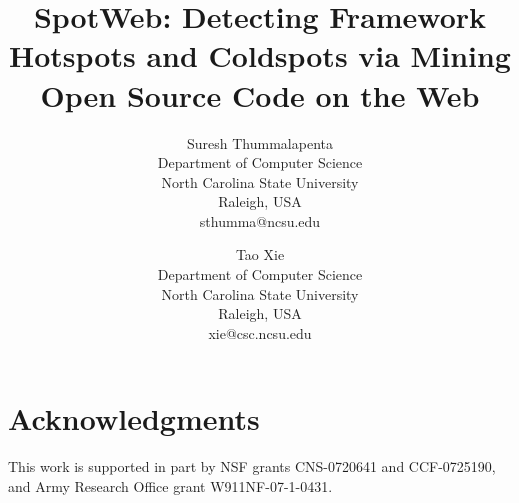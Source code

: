 \documentclass[conference]{IEEEtran}
\begin{document}
\title{SpotWeb: Detecting Framework Hotspots and Coldspots via Mining Open Source Code on the Web}

\author{Suresh Thummalapenta\\
Department of Computer Science\\ North Carolina State University \\
Raleigh, USA\\ sthumma@ncsu.edu\\
\and
Tao Xie\\
Department of Computer Science\\ North Carolina State University \\
Raleigh, USA\\ xie@csc.ncsu.edu\\
}

\maketitle
\thispagestyle{empty}










\section*{Acknowledgments}

This work is supported in part by NSF grants CNS-0720641 and
CCF-0725190, and Army Research Office grant W911NF-07-1-0431.



\end{document}
